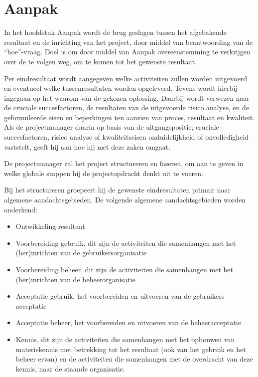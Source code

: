 \section{Aanpak}

In het hoofdstuk Aanpak wordt de brug geslagen tussen het afgebakende resultaat en de inrichting van het project,
door middel van beantwoording van de ``hoe''-vraag.
Doel is om door middel van Aanpak overeenstemming te verkrijgen over de te volgen weg, om te komen tot het gewenste resultaat.

Per eindresultaat wordt aangegeven welke activiteiten zullen worden uitgevoerd en eventueel welke tussenresultaten worden opgeleverd.
Tevens wordt hierbij ingegaan op het waarom van de gekozen oplossing.
Daarbij wordt verwezen naar de cruciale succesfactoren, de resultaten van de uitgevoerde risico analyse,
en de geformuleerde eisen en beperkingen ten aanzien van proces, resultaat en kwaliteit.
Als de projectmanager daarin op basis van de uitgangspositie, cruciale succesfactoren,
risico analyse of kwaliteitseisen onduidelijkheid of onvolledigheid vaststelt, geeft hij aan hoe hij met deze zaken omgaat.

De projectmanager zal het project structureren en faseren,
om aan te geven in welke globale stappen hij de projectopdracht denkt uit te voeren.

Bij het structureren groepeert hij de gewenste eindresultaten primair naar algemene aandachtsgebieden.
De volgende algemene aandachtsgebieden worden onderkend:

\begin{itemize}
  \item Ontwikkeling resultaat
  \item Voorbereiding gebruik, dit zijn de activiteiten die samenhangen met het (her)inrichten van de gebruikersorganisatie
  \item Voorbereiding beheer, dit zijn de activiteiten die samenhangen met het (her)inrichten van de beheerorganisatie
  \item Acceptatie gebruik, het voorbereiden en uitvoeren van de gebruikers-acceptatie
  \item Acceptatie beheer, het voorbereiden en uitvoeren van de beheeracceptatie
  \item Kennis, dit zijn de activiteiten die samenhangen met het opbouwen van materiekennis met betrekking tot het resultaat
  (ook van het gebruik en het beheer ervan) en de activiteiten die samenhangen met de overdracht van deze kennis,
  naar de staande organisatie.
\end{itemize}

